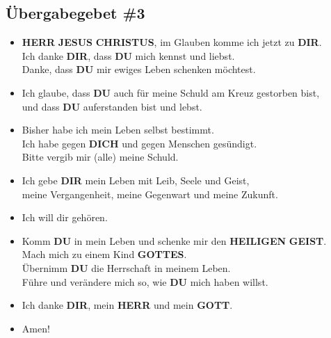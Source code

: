 \documentclass[10pt,a5paper]{article}
\newcommand{\Christus}[0]{\textbf{CHRISTUS}}
\newcommand{\Dich}[0]{\textbf{DICH}}
\newcommand{\Dir}[0]{\textbf{DIR}}
\newcommand{\Du}[0]{\textbf{DU}}
\newcommand{\Geist}[0]{\textbf{GEIST}}
\newcommand{\Gottes}[0]{\textbf{GOTTES}}
\newcommand{\Gott}[0]{\textbf{GOTT}}
\newcommand{\Heiligen}[0]{\textbf{HEILIGEN}}
\newcommand{\Herr}[0]{\textbf{HERR}}
\newcommand{\Jesus}[0]{\textbf{JESUS}}
\begin{document}
	\subsection{\"Ubergabegebet \#3}
		\begin{itemize}[nosep]
			\item	{\Herr} {\Jesus} {\Christus},
					im Glauben komme ich jetzt zu {\Dir}.
					\\
					Ich danke {\Dir},
					dass {\Du} mich kennst und liebst.
					\\
					Danke,
					dass {\Du} mir ewiges Leben schenken m\"ochtest.
			\item	Ich glaube,
					dass {\Du} auch f\"ur meine Schuld am Kreuz gestorben bist,
					\\
					und dass {\Du} auferstanden bist und lebst.
			\item	Bisher habe ich mein Leben selbst bestimmt.
					\\
					Ich habe gegen {\Dich} und gegen Menschen ges\"undigt.
					\\
					Bitte vergib mir (alle) meine Schuld.
			\item	Ich gebe {\Dir} mein Leben mit Leib,
					Seele und Geist,
					\\
					meine Vergangenheit,
					meine Gegenwart und meine Zukunft.
			\item	Ich will dir geh\"oren.
			\item	Komm {\Du} in mein Leben und schenke mir den {\Heiligen} {\Geist}.
					\\
					Mach mich zu einem Kind {\Gottes}.
					\\
					\"Ubernimm {\Du} die Herrschaft in meinem Leben.
					\\
					F\"uhre und ver\"andere mich so,
					wie {\Du} mich haben willst.
			\item	Ich danke {\Dir},
					mein {\Herr} und mein {\Gott}.
			\item	Amen!
		\end{itemize}
\end{document}
